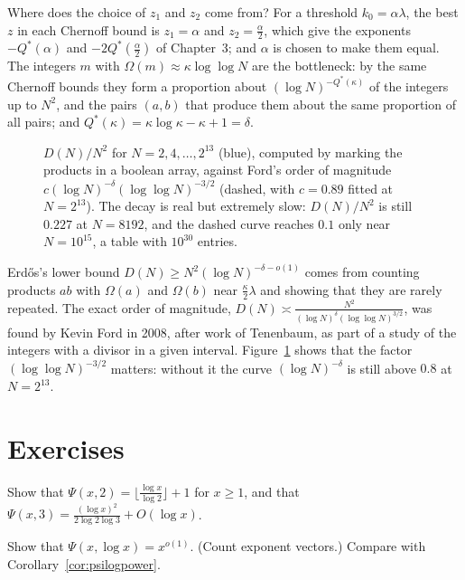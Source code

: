 Where does the choice of $z_1$ and $z_2$ come from? For a threshold $k_0=\alpha\lambda$, the best $z$ in each Chernoff bound is $z_1=\alpha$ and $z_2=\frac\alpha2$, which give the exponents $-Q^*(\alpha)$ and $-2Q^*(\frac\alpha2)$ of Chapter~3; and $\alpha$ is chosen to make them equal. The integers $m$ with $\Omega(m)\approx\kappa\log\log N$ are the bottleneck: by the same Chernoff bounds they form a proportion about $(\log N)^{-Q^*(\kappa)}$ of the integers up to $N^2$, and the pairs $(a,b)$ that produce them about the same proportion of all pairs; and $Q^*(\kappa)=\kappa\log\kappa-\kappa+1=\delta$.

\begin{figure}[ht]
\centering{}
\caption{$D(N)/N^2$ for $N=2,4,\dots,2^{13}$ (blue), computed by marking the products in a boolean array, against Ford's order of magnitude $c(\log N)^{-\delta}(\log\log N)^{-3/2}$ (dashed, with $c=0.89$ fitted at $N=2^{13}$). The decay is real but extremely slow: $D(N)/N^2$ is still $0.227$ at $N=8192$, and the dashed curve reaches $0.1$ only near $N=10^{15}$, a table with $10^{30}$ entries.}
\label{fig:table}
\end{figure}

\begin{remark}
Erd\H{o}s's lower bound $D(N)\ge N^2(\log N)^{-\delta-o(1)}$ comes from counting products $ab$ with $\Omega(a)$ and $\Omega(b)$ near $\frac\kappa2\lambda$ and showing that they are rarely repeated. The exact order of magnitude, $D(N)\asymp\frac{N^2}{(\log N)^\delta(\log\log N)^{3/2}}$, was found by Kevin Ford in 2008, after work of Tenenbaum, as part of a study of the integers with a divisor in a given interval. Figure~\ref{fig:table} shows that the factor $(\log\log N)^{-3/2}$ matters: without it the curve $(\log N)^{-\delta}$ is still above $0.8$ at $N=2^{13}$.
\end{remark}

\section{Exercises}

\begin{exercise}[$\star$]\label{ex:psi23}
Show that $\Psi(x,2)=\lfloor\frac{\log x}{\log2}\rfloor+1$ for $x\ge1$, and that $\Psi(x,3)=\frac{(\log x)^2}{2\log2\log3}+O(\log x)$.
\end{exercise}

\begin{exercise}[$\star\star$]\label{ex:psilog}
Show that $\Psi(x,\log x)=x^{o(1)}$. (Count exponent vectors.) Compare with Corollary~\ref{cor:psilogpower}.
\end{exercise}

